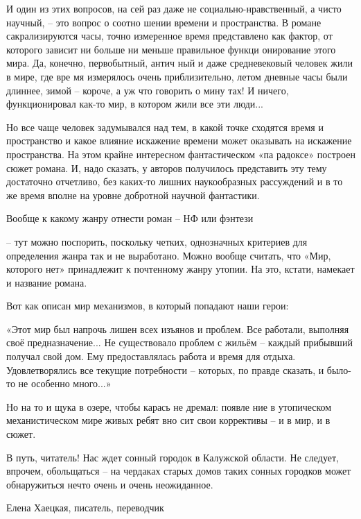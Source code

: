 И один из этих вопросов, на сей раз даже не социально-нравственный, а чисто
научный, – это вопрос о соотно шении времени и пространства. В романе
сакрализируются часы, точно измеренное время представлено как фактор, от
которого зависит ни больше ни меньше правильное функци онирование этого мира.
Да, конечно, первобытный, антич ный и даже средневековый человек жили в мире,
где вре мя измерялось очень приблизительно, летом дневные часы были длиннее,
зимой – короче, а уж что говорить о мину тах! И ничего, функционировал как-то
мир, в котором жили все эти люди... 

Но все чаще человек задумывался над тем, в какой точке сходятся время и
пространство и какое влияние искажение времени может оказывать на искажение
пространства. На этом крайне интересном фантастическом «па радоксе» построен
сюжет романа. И, надо сказать, у авторов получилось представить эту тему
достаточно отчетливо, без каких-то лишних наукообразных рассуждений и в то же
время вполне на уровне добротной научной фантастики.

Вообще к какому жанру отнести роман – НФ или фэнтези

– тут можно поспорить, поскольку четких, однозначных критериев для определения
жанра так и не выработано. Можно вообще считать, что «Мир, которого нет»
принадлежит к почтенному жанру утопии. На это, кстати, намекает и название
романа.

Вот как описан мир механизмов, в который попадают наши герои:

«Этот мир был напрочь лишен всех изъянов и проблем.  Все работали, выполняя
своё предназначение... Не существовало проблем с жильём – каждый прибывший
получал свой дом. Ему предоставлялась работа и время для отдыха.
Удовлетворялись все текущие потребности – которых, по правде сказать, и было-то
не особенно много...»

Но на то и щука в озере, чтобы карась не дремал: появле ние в утопическом
механистическом мире живых ребят вно сит свои коррективы – и в мир, и в сюжет.

В путь, читатель! Нас ждет сонный городок в Калужской области. Не следует,
впрочем, обольщаться – на чердаках старых домов таких сонных городков может
обнаружиться нечто очень и очень неожиданное.

Елена Хаецкая, писатель, переводчик
